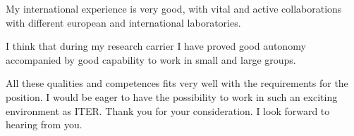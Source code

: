 \documentclass[12pt,stdletter,a4paper,dateno,sigleft]{newlfm}
\begin{document}
\begin{newlfm}
My international experience is very good, with vital and active
collaborations with different european and international laboratories. 

I think that during my research carrier I have proved good autonomy
accompanied by good capability to work in small and large groups. 

All these qualities and competences fits very well with the
requirements for the position. I would be eager to have the possibility to work in such an exciting environment as ITER.
Thank you for your consideration.  I look forward to
hearing from you.

\end{newlfm}
\end{document}
